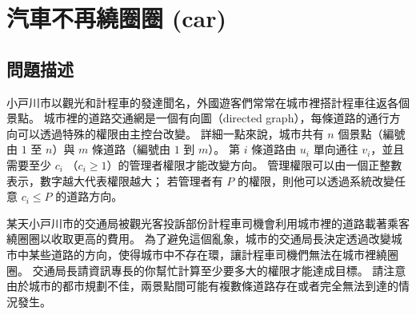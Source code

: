 \section{汽車不再繞圈圈 (car)}

\subsection{問題描述}

小戸川市以觀光和計程車的發達聞名，外國遊客們常常在城巿裡搭計程車往返各個景點。
城巿裡的道路交通網是一個有向圖（directed
graph），每條道路的通行方向可以透過特殊的權限由主控台改變。
詳細一點來說，城市共有 \begin{math}n\end{math} 個景點（編號由
\begin{math}1\end{math} 至 \begin{math}n\end{math}）與
\begin{math}m\end{math} 條道路（編號由 \begin{math}1\end{math} 到
\begin{math}m\end{math}）。 第 \begin{math}i\end{math} 條道路由
\begin{math}u_i\end{math} 單向通往
\begin{math}v_i\end{math}，並且需要至少 \begin{math}c_i\end{math}
（\begin{math}c_i \ge 1\end{math}）的管理者權限才能改變方向。
管理權限可以由一個正整數表示，數字越大代表權限越大； 若管理者有
\begin{math}P\end{math} 的權限，則他可以透過系統改變任意
\begin{math}c_i \le P\end{math} 的道路方向。

某天小戸川市的交通局被觀光客投訴部份計程車司機會利用城巿裡的道路載著乘客繞圈圈以收取更高的費用。
為了避免這個亂象，城巿的交通局長決定透過改變城市中某些道路的方向，使得城市中不存在環，讓計程車司機們無法在城巿裡繞圈圈。
交通局長請資訊專長的你幫忙計算至少要多大的權限才能達成目標。
請注意由於城市的都市規劃不佳，兩景點間可能有複數條道路存在或者完全無法到達的情況發生。

